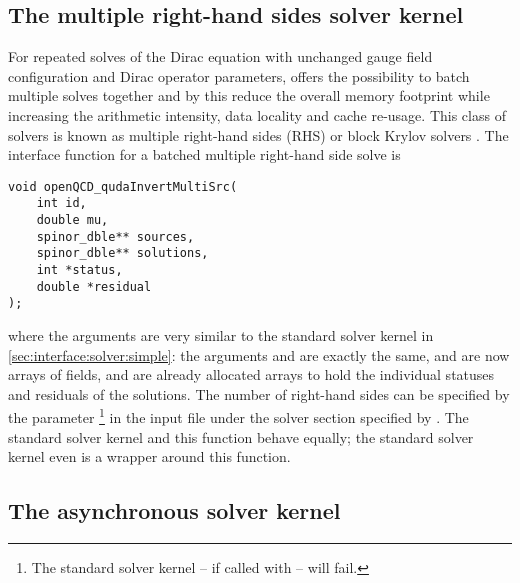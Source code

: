 
\subsection{The multiple right-hand sides solver kernel}
\label{sec:interface:solver:mrhs}

For repeated solves of the Dirac equation with unchanged gauge field configuration and Dirac operator parameters, \quda offers the possibility to batch multiple solves together and by this reduce the overall memory footprint while increasing the arithmetic intensity, data locality and cache re-usage.
This class of solvers is known as multiple right-hand sides (RHS) or block Krylov solvers \cite{Sakurai:2009rb,Nakamura:2011my,Birk:2011jly,Clark:2017ekr,Boyle:2024pio,Richtmann:2016kcq,Boyle:2014rwa}.
The interface function for a batched multiple right-hand side solve is
\begin{verbatim}
void openQCD_qudaInvertMultiSrc(
    int id,
    double mu,
    spinor_dble** sources,
    spinor_dble** solutions,
    int *status,
    double *residual
);
\end{verbatim}
where the arguments are very similar to the standard solver kernel in \cref{sec:interface:solver:simple}:
the arguments  and  are exactly the same,  and  are now arrays of  fields,  and  are already allocated arrays to hold the individual statuses and residuals of the solutions.
The number of right-hand sides can be specified by the parameter \footnote{The standard solver kernel -- if called with  -- will fail.} in the input file under the solver section specified by .
The standard solver kernel and this function behave equally; the standard solver kernel even is a wrapper around this function.

\subsection{The asynchronous solver kernel}
\label{sec:interface:solver:async}

